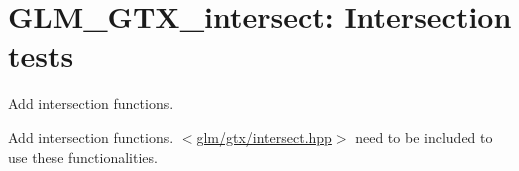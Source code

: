 \hypertarget{group__gtx__intersect}{\section{\-G\-L\-M\-\_\-\-G\-T\-X\-\_\-intersect\-: \-Intersection tests}
\label{group__gtx__intersect}
}


\-Add intersection functions.  


\-Add intersection functions. $<$\hyperlink{intersect_8hpp}{glm/gtx/intersect.\-hpp}$>$ need to be included to use these functionalities. 